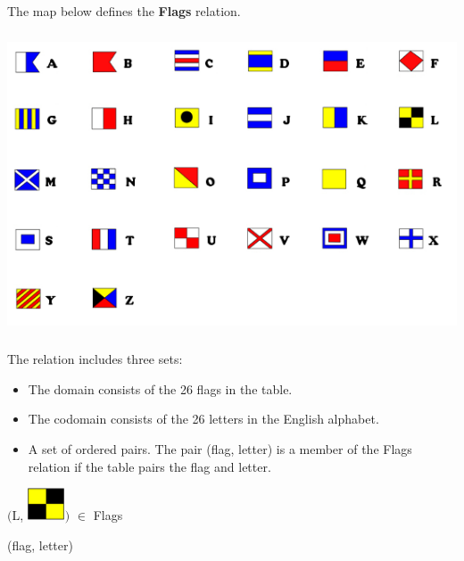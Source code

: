 \documentclass{ximera}
\begin{document}
\begin{definition}
  The map below defines the \textbf{Flags} relation.
  
  

    \includegraphics[width=536px,height=338px]{pics/flags/flag_letter.png}

  
 

  The  relation includes three sets:
    \begin{itemize}
    \item The domain consists of the 26 flags in the table.
    \item The codomain consists of the 26 letters in the English alphabet.
    \item A set of ordered pairs. The pair (flag, letter) is a member of the Flags relation if the table pairs the flag and letter.
    \end{itemize}

  
\end{definition}



\begin{exercise}

 $\bigg($L, {\includegraphics[width=42px,height=36px]{pics/flags/L.png}}$\bigg)$ $\in$ Flags 

  \begin{multipleChoice}
  \end{multipleChoice}
  \begin{feedback}
 (flag, letter)
  \end{feedback}
\end{exercise}
\end{document}
